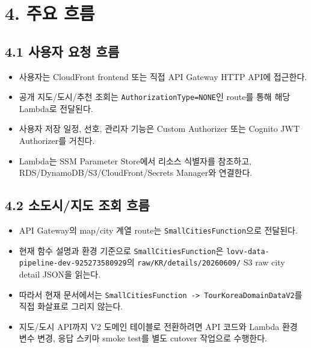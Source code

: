 \documentclass[12pt,a4paper]{article}
\newcommand{\DocNeedspace}[1]{\par\ifdim\dimexpr\pagegoal-\pagetotal\relax<#1\newpage\fi}
\begin{document}
\section*{4. 주요 흐름}


\DocNeedspace{8\baselineskip}
\subsection*{4.1 사용자 요청 흐름}


\begin{itemize}
\item 사용자는 CloudFront frontend 또는 직접 API Gateway HTTP API에 접근한다.
\item 공개 지도/도시/추천 조회는 \texttt{Authorization\allowbreak{}Type=NONE}인 route를 통해 해당 Lambda로 전달된다.
\item 사용자 저장 일정, 선호, 관리자 기능은 Custom Authorizer 또는 Cognito JWT Authorizer를 거친다.
\item Lambda는 SSM Parameter Store에서 리소스 식별자를 참조하고, RDS/DynamoDB/S3/CloudFront/Secrets Manager와 연결한다.
\end{itemize}


\newpage
\DocNeedspace{24\baselineskip}
\subsection*{4.2 소도시/지도 조회 흐름}


\begin{itemize}
\item API Gateway의 map/city 계열 route는 \texttt{Small\allowbreak{}Cities\allowbreak{}Function}으로 전달된다.
\item 현재 함수 설명과 환경 기준으로 \texttt{Small\allowbreak{}Cities\allowbreak{}Function}은 \texttt{lovv-\allowbreak{}data-\allowbreak{}pipeline-\allowbreak{}dev-\allowbreak{}925273580929}의 \texttt{raw/\allowbreak{}KR/\allowbreak{}details/\allowbreak{}20260609/\allowbreak{}} S3 raw city detail JSON을 읽는다.
\item 따라서 현재 문서에서는 \texttt{Small\allowbreak{}Cities\allowbreak{}Function -\allowbreak{}>\allowbreak{} Tour\allowbreak{}Korea\allowbreak{}Domain\allowbreak{}Data\allowbreak{}V2}를 직접 화살표로 그리지 않는다.
\item 지도/도시 API까지 V2 도메인 테이블로 전환하려면 API 코드와 Lambda 환경 변수 변경, 응답 스키마 smoke test를 별도 cutover 작업으로 수행한다.
\end{itemize}
\end{document}

